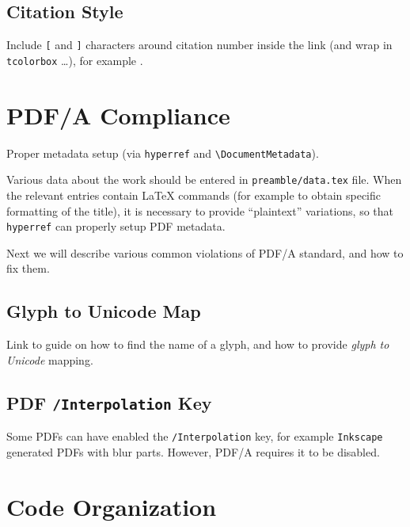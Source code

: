 \subsection{Citation Style}%
\label{sub:Citation Style}

Include \texttt{[} and \texttt{]} characters around citation number inside the link (and wrap in \texttt{tcolorbox} \ldots), for example \autocite{Dujava2022}.


\section{PDF/A Compliance}%
\label{sec:PDF/A Compliance}

Proper metadata setup (via \texttt{hyperref} and \verb|\DocumentMetadata|).
\begin{Note}
    Various data about the work should be entered in \texttt{preamble/data.tex} file. When the relevant entries contain \LaTeX{} commands (for example to obtain specific formatting of the title), it is necessary to provide \enquote{plaintext} variations, so that \texttt{hyperref} can properly setup PDF metadata.
\end{Note}

Next we will describe various common violations of PDF/A standard, and how to fix them.

\subsection{Glyph to Unicode Map}%
\label{sub:Glyph to Unicode Map}

\begin{Todo}
    Link to guide on how to find the name of a glyph, and how to provide \emph{glyph to Unicode} mapping.
\end{Todo}

\subsection{PDF \texorpdfstring{\texttt{/Interpolation}}{/Interpolation} Key}%
\label{sub:PDF Interpolation Key}

Some PDFs can have enabled the \texttt{/Interpolation} key, for example \texttt{Inkscape} generated PDFs with blur parts.
However, PDF/A requires it to be disabled.


\section{Code Organization}%
\label{sec:Code Organization}

